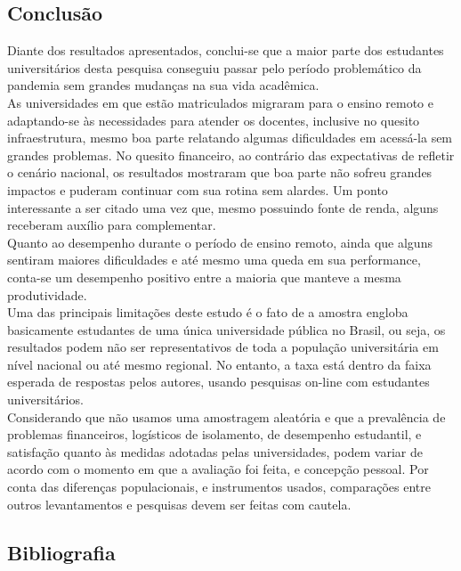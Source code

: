 \documentclass[
]{article}
\begin{document}
\hypertarget{conclusuxe3o}{%
\subsection{Conclusão}\label{conclusuxe3o}}

Diante dos resultados apresentados, conclui-se que a maior parte dos
estudantes universitários desta pesquisa conseguiu passar pelo período
problemático da pandemia sem grandes mudanças na sua vida acadêmica.\\
As universidades em que estão matriculados migraram para o ensino remoto
e adaptando-se às necessidades para atender os docentes, inclusive no
quesito infraestrutura, mesmo boa parte relatando algumas dificuldades
em acessá-la sem grandes problemas. No quesito financeiro, ao contrário
das expectativas de refletir o cenário nacional, os resultados mostraram
que boa parte não sofreu grandes impactos e puderam continuar com sua
rotina sem alardes. Um ponto interessante a ser citado uma vez que,
mesmo possuindo fonte de renda, alguns receberam auxílio para
complementar.\\
Quanto ao desempenho durante o período de ensino remoto, ainda que
alguns sentiram maiores dificuldades e até mesmo uma queda em sua
performance, conta-se um desempenho positivo entre a maioria que manteve
a mesma produtividade.\\
Uma das principais limitações deste estudo é o fato de a amostra engloba
basicamente estudantes de uma única universidade pública no Brasil, ou
seja, os resultados podem não ser representativos de toda a população
universitária em nível nacional ou até mesmo regional. No entanto, a
taxa está dentro da faixa esperada de respostas pelos autores, usando
pesquisas on-line com estudantes universitários.\\
Considerando que não usamos uma amostragem aleatória e que a prevalência
de problemas financeiros, logísticos de isolamento, de desempenho
estudantil, e satisfação quanto às medidas adotadas pelas universidades,
podem variar de acordo com o momento em que a avaliação foi feita, e
concepção pessoal. Por conta das diferenças populacionais, e
instrumentos usados, comparações entre outros levantamentos e pesquisas
devem ser feitas com cautela.

\hypertarget{bibliografia}{%
\subsection{Bibliografia}\label{bibliografia}}
\end{document}
